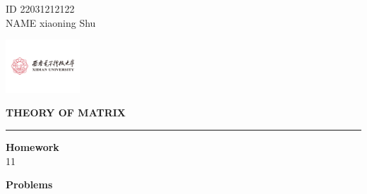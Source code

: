 \documentclass[11pt,letterpaper]{ctexart}
\begin{document}
\pagestyle{plain}
\begin{flushleft}
ID 22031212122 \\
NAME xiaoning Shu\\
\end{flushleft}

\begin{flushright}\vspace{-18mm}
\includegraphics[height=2.0cm]{logo.png}
\end{flushright}
 
\begin{center}\vspace{-0.1cm}
\textbf{ \large THEORY OF MATRIX}\\
\end{center}

 
\rule{\linewidth}{0.1mm}

\bigskip
\textbf{\large{Homework}}
\\

{11}



\bigskip
\textbf{\large{Problems}}
\end{document}
